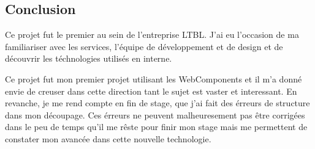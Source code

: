 \subsection{Conclusion}
\label{bmxconclusion}

Ce projet fut le premier au sein de l'entreprise LTBL.
J'ai eu l'occasion de ma familiariser avec les services, l'équipe de développement et de design et de découvrir les téchnologies utilisés en interne.

Ce projet fut mon premier projet utilisant les WebComponents et il m'a donné envie de creuser dans cette direction tant le sujet est vaster et interessant.
En revanche, je me rend compte en fin de stage, que j'ai fait des érreurs de structure dans mon découpage.
Ces érreurs ne peuvent malheuresement pas être corrigées dans le peu de temps qu'il me rêste pour finir mon stage mais me permettent de constater mon avancée dans cette nouvelle technologie.